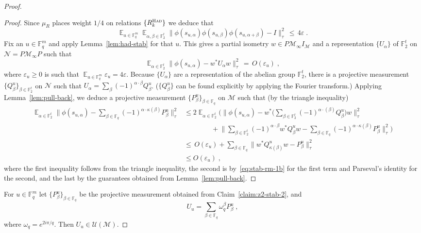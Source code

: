 \documentclass[11pt]{article}
\theoremstyle{definition}
\newcommand{\Id}{\ensuremath{I}}
\DeclareMathOperator*{\Expectation}{\mathbb{E}}
\newcommand{\Es}[1]{\Expectation_{#1}}
\newcommand{\F}{\ensuremath{\mathbb{F}}}
\newcommand{\mM}{\ensuremath{\mathcal{M}}}
\newcommand{\mU}{\ensuremath{\mathcal{U}}}
\newcommand{\had}{\textsc{Had}}
\newcommand{\eps}{\varepsilon}
\newcommand{\mN}{\mathcal{N}}
\begin{document}
\begin{proof}
\begin{proof}
Since $\mu_R$ places weight $1/4$ on relations $\{R^\had_k\}$ we deduce that 
\begin{equation}\label{eq:stab-rm-1}
\Es{u\in \F_q^m} \Es{\alpha,\beta\in \F_2^t} \big\|\phi(s_{u,\alpha})\phi(s_{u,\beta})\phi(s_{u,\alpha+\beta})-\Id\big\|_\tau^2 \,\leq\, 4\eps\;. 
\end{equation}
Fix an $u\in \F_q^m$ and apply Lemma~\ref{lem:had-stab} for that $u$. This gives a partial isometry $w\in P\mM_\infty\Id_\mM$ and a representation $\{U_\alpha\}$ of $\F_2^t$ on $\mN=P\mM_\infty P$ such that 
\begin{equation}\label{eq:stab-rm-1b}
 \Es{\alpha \in \F_2^t} \big\| \phi(s_{u,\alpha}) - w^* U_\alpha w \big\|_\tau^2 \,=\, O(\eps_u)\;,
\end{equation}
where $\eps_u\geq 0$ is such that $\Es{u\in \F_q^m} \eps_u = 4\eps$. Because $\{U_\alpha\}$ are a representation of the abelian group $\F_2^t$, there is a projective measurement $\{Q^u_\beta\}_{\beta\in \F_2^t}$ on $\mN$ such that $U_\alpha = \sum_\beta (-1)^{\alpha\cdot \beta} Q^u_\beta$. ($\{Q^u_\beta\}$ can be found explicitly by applying the Fourier transform.) Applying Lemma~\ref{lem:pull-back}, we deduce a projective measurement $\{P^u_\beta\}_{\beta\in \F_q}$  on $\mM$ such that (by the triangle inequality)
\begin{align*}
 \Es{\alpha \in \F_2^t} \Big\| \phi(s_{u,\alpha}) - \sum_{\beta\in\F_q} (-1)^{\alpha \cdot \kappa(\beta)} P^u_\beta \Big\|_\tau^2
&\leq 2 \Es{\alpha \in \F_2^t} \Big( \Big\| \phi(s_{u,\alpha}) - w^*\Big(\sum_{\beta\in\F_2^t} (-1)^{\alpha \cdot (\beta)} Q^u_\beta \Big) w \Big\|_\tau^2 \\
&\qquad\qquad+   \Big\|  \sum_{\beta\in\F_2^t} (-1)^{\alpha \cdot \beta} w^* Q^u_\beta w - \sum_{\beta\in\F_q} (-1)^{\alpha \cdot \kappa(\beta)} P^u_\beta \Big\|_\tau^2\Big)\\
 &\leq\, O(\eps_u) +  \sum_{\beta\in\F_q} \Big\| w^* Q^u_{\kappa(\beta)} w - P^u_{\beta} \Big\|_\tau^2\\
&\leq O(\eps_u)\;,
\end{align*}
where the first inequality follows from the triangle inequality, the second is by~\eqref{eq:stab-rm-1b} for the first term and Parseval's identity for the second, and the last by the guarantees obtained from Lemma~\ref{lem:pull-back}.
\end{proof}

For $u\in \F_q^m$ let $\{P^{u}_\beta\}_{\beta \in \F_q}$ be the projective measurement obtained from Claim~\ref{claim:z2-stab-2}, and 
\[ U_u = \sum_{\beta\in\F_q} \omega_q^\beta P^u_{\beta}\;,\]
where $\omega_q = e^{2i\pi/q}$. Then $U_u \in \mU(\mM)$. 


\end{proof}
\end{document}

